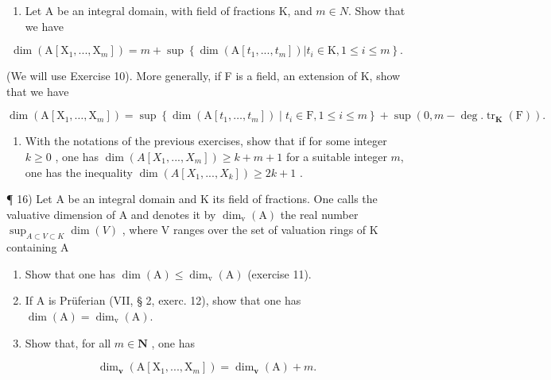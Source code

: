\begin{enumerate}
\def\labelenumi{\arabic{enumi})}
\setcounter{enumi}{13}
\tightlist
\item
  Let A be an integral domain, with field of fractions K, and \(m \in N\). Show that we have
\end{enumerate}

\[
\dim (\mathrm{A} [ \mathrm{X} _ {1},..., \mathrm{X} _ {m} ]) = m + \sup \left\{\dim (\mathrm{A} [ t _ {1},..., t _ {m} ]) | t _ {i} \in \mathrm{K}, 1 \leqslant i \leqslant m \right\}.
\]

(We will use Exercise 10). More generally, if F is a field, an extension of K, show that we have

\[
\dim \left(\mathrm{A} \left[ \mathrm{X} _ {1}, \dots , \mathrm{X} _ {m} \right]\right) = \sup \left\{\dim (\mathrm{A} \left[ t _ {1}, \dots , t _ {m} \right]) \mid t _ {i} \in \mathrm{F}, 1 \leqslant i \leqslant m \right\} + \sup (0, m - \deg . \operatorname{tr} _ {\mathbf {K}} (\mathrm{F})).
\]

\begin{enumerate}
\def\labelenumi{\arabic{enumi})}
\setcounter{enumi}{14}
\tightlist
\item
  With the notations of the previous exercises, show that if for some integer \(k \geqslant 0\) , one has \(\dim(A[X_1, ..., X_m]) \geqslant k + m + 1\) for a suitable integer \(m\), one has the inequality \(\dim(A[X_1, ..., X_k]) \geqslant 2k + 1\) .
\end{enumerate}

  ¶ 16) Let A be an integral domain and K its field of fractions. One calls the valuative dimension of A and denotes it by \(\dim_{\mathrm v}(\mathrm A)\) the real number \(\sup_{A \subset V \subset K} \dim(V)\) , where V ranges over the set of valuation rings of K containing A

\begin{enumerate}
\def\labelenumi{\alph{enumi})}
\item
  Show that one has \(\dim(\mathrm A) \leqslant \dim_{\mathrm v}(\mathrm A)\) (exercise 11).
\item
  If A is Prüferian (VII, § 2, exerc. 12), show that one has \(\dim(\mathrm A) = \dim_{\mathrm v}(\mathrm A)\).
\item
  Show that, for all \(m \in \mathbf{N}\) , one has
\end{enumerate}

\[
\dim_ {\mathbf {v}} (\mathrm{A} [ \mathrm{X} _ {1},..., \mathrm{X} _ {m} ]) = \dim_ {\mathbf {v}} (\mathrm{A}) + m.
\]


